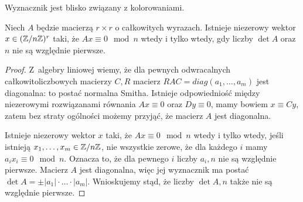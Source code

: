 

Wyznacznik jest blisko związany z kolorowaniami.

\begin{lemma}
    Niech $A$ będzie macierzą $r \times r$ o całkowitych wyrazach.
    Istnieje niezerowy wektor $x \in (\mathbb Z/n\mathbb Z)^r$ taki, że $Ax \equiv 0 \mod n$ wtedy i tylko wtedy, gdy liczby $\det A$ oraz $n$ nie są względnie pierwsze.
\end{lemma}

\begin{proof}
    Z~algebry liniowej wiemy, że dla pewnych odwracalnych całkowitoliczbowych macierzy $C, R$ macierz $RAC = diag(a_1, \ldots, a_m)$ jest diagonalna: to postać normalna Smitha.
    Istnieje odpowiedniość między niezerowymi rozwiązanami równania $Ax \equiv 0$ oraz $Dy \equiv 0$, mamy bowiem $x \equiv Cy$, zatem bez straty ogólności możemy przyjąć, że macierz $A$ jest diagonalna.

    Istnieje niezerowy wektor $x$ taki, że $Ax \equiv 0 \mod n$ wtedy i tylko wtedy, jeśli istnieją $x_1, \ldots, x_m \in \mathbb Z/n\mathbb Z$, nie wszystkie zerowe, że dla każdego $i$ mamy $a_ix_i \equiv 0 \mod n$.
    Oznacza to, że dla pewnego $i$ liczby $a_i, n$ nie są względnie pierwsze.
    Macierz $A$ jest diagonalna, więc jej wyznacznik ma postać $\det A = \pm |a_1| \cdot \ldots \cdot |a_m|$.
    Wnioskujemy stąd, że liczby $\det A, n$ także nie są względnie pierwsze.
\end{proof}

